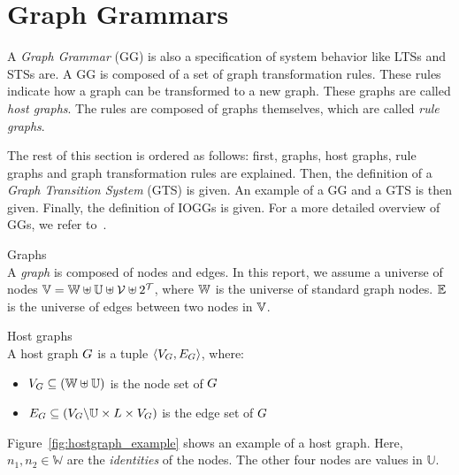 \section{Graph Grammars}\label{sec:graph}
A \textit{Graph Grammar} (GG) is also a specification of system behavior like LTSs and STSs are. A GG is composed of a set of graph transformation rules. These rules indicate how a graph can be transformed to a new graph. These graphs are called \textit{host graphs}. The rules are composed of graphs themselves, which are called \textit{rule graphs}.

The rest of this section is ordered as follows: first, graphs, host graphs, rule graphs and graph transformation rules are explained. Then, the definition of a \textit{Graph Transition System} (GTS) is given. An example of a GG and a GTS is then given. Finally, the definition of IOGGs is given. For a more detailed overview of GGs, we refer to~\cite{Rensink:graph_grammars, Heckel2006187, Andries1999}.

\vspace{10px}
\begin{definition} Graphs \\
A \textit{graph} is composed of nodes and edges. In this report, we assume a universe of nodes $\mathbb{V} = \mathbb{W} \uplus \mathbb{U} \uplus \mathcal{V} \uplus 2^{\mathcal{T}}$, where $\mathbb{W}$ is the universe of standard graph nodes. $\mathbb{E}$ is the universe of edges between two nodes in $\mathbb{V}$.
\end{definition}

\vspace{10px}
\begin{definition} Host graphs \\
A host graph $G$ is a tuple $\langle V_{G}, E_{G}\rangle$, where:
\begin{itemize}
  \item $V_{G} \subseteq (\mathbb{W} \uplus \mathbb{U})$ is the node set of $G$
  \item $E_{G} \subseteq (V_{G}\backslash\mathbb{U} \times L \times V_{G})$ is the edge set of $G$
\end{itemize}
\end{definition}
\vspace{10px}

Figure~\ref{fig:hostgraph_example} shows an example of a host graph. Here, $n_1, n_2 \in \mathbb{W}$ are the \textit{identities} of the nodes. The other four nodes are values in $\mathbb{U}$.

